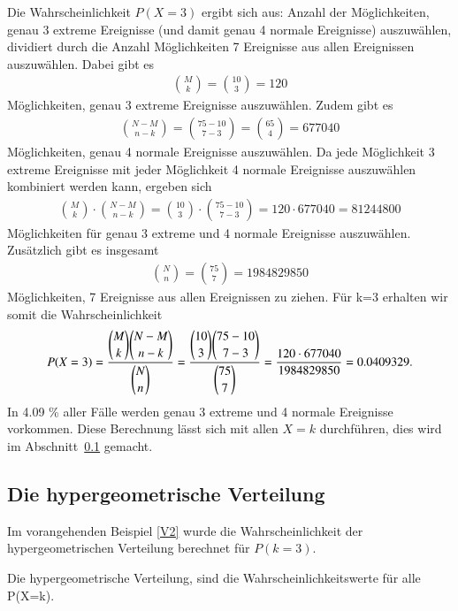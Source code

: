 \begin{refsection}
Die Wahrscheinlichkeit $P(X=3)$ ergibt sich aus:
Anzahl der Möglichkeiten, genau 3 extreme Ereignisse (und damit genau 4 normale Ereignisse) auszuwählen, dividiert durch die Anzahl Möglichkeiten 7 Ereignisse aus allen Ereignissen auszuwählen. Dabei gibt es
\begin{align*}
\binom{M}{k} = \binom{10}{3} = 120
\end{align*}
%
Möglichkeiten, genau 3 extreme Ereignisse auszuwählen.
Zudem gibt es 
\begin{align*}
\binom{N-M}{n-k} = \binom{75-10}{7-3} = \binom{65}{4} = 677040
\end{align*}
%
Möglichkeiten, genau 4 normale Ereignisse auszuwählen.
Da jede Möglichkeit 3 extreme Ereignisse mit jeder Möglichkeit 4 normale Ereignisse auszuwählen kombiniert werden kann, ergeben sich
\begin{align*}
\binom{M}{k} \cdot \binom{N-M}{n-k} = \binom{10}{3} \cdot \binom{75-10}{7-3} = 120 
\cdot 677040 = 81244800
\end{align*}
%
Möglichkeiten für genau 3 extreme und 4 normale Ereignisse auszuwählen.
Zusätzlich gibt es insgesamt
\begin{align*}
\binom{N}{n} = \binom{75}{7} = 1984829850
\end{align*}
%
Möglichkeiten, 7 Ereignisse aus allen Ereignissen zu ziehen.
Für k=3 erhalten wir somit die Wahrscheinlichkeit
\begin{equation}
P(X = 3) = \frac{\displaystyle \binom{M}{k} \binom{N-M}{n-k}}{\displaystyle \binom{N}{n} }  \\
= \frac{\displaystyle \binom{10}{3} \binom{75-10}{7-3}}{\displaystyle \binom{75}{7} } \\
= \frac{ 120 \cdot 677040}{ 1984829850 } = 0.0409329.
\label {V2}
\end{equation}
%
In 4.09 \% aller Fälle werden genau 3 extreme und 4 normale Ereignisse vorkommen. Diese Berechnung lässt sich mit allen $X=k$ durchführen, dies wird im Abschnitt~\ref{Dichtehyper} gemacht.


\subsection{Die hypergeometrische Verteilung} \label{Dichtehyper}
Im vorangehenden Beispiel \eqref{V2} wurde die Wahrscheinlichkeit der hypergeometrischen Verteilung berechnet für $P(k = 3)$. 

\begin{definition}
Die hypergeometrische Verteilung, sind die Wahrscheinlichkeitswerte für alle P(X=k).
\end{definition}


\end{refsection}
